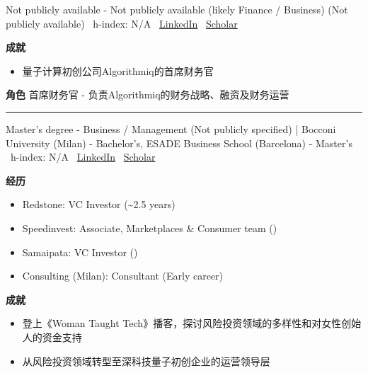 \par{\footnotesize\color{graytext}Not publicly available - Not publicly available (likely Finance / Business) (Not publicly available) \textbar\  h-index: N/A \textbar\  \href{https://www.linkedin.com/in/benjaminbakkernz/}{LinkedIn} \textbar\  \href{N/A}{Scholar}}
\par{\footnotesize\color{mainred}\textbf{成就}}
\begin{itemize}[leftmargin=1.2em,itemsep=0pt,topsep=0pt]
\item {\footnotesize 量子计算初创公司Algorithmiq的首席财务官}
\end{itemize}
\par{\footnotesize\color{mainred}\textbf{角色}} {\footnotesize 首席财务官 - 负责Algorithmiq的财务战略、融资及财务运营}
\vspace{2pt}\hrule\vspace{2pt}
\vspace{4pt}
\par{\footnotesize\color{graytext}Master's degree - Business / Management (Not publicly specified) | Bocconi University (Milan) - Bachelor's, ESADE Business School (Barcelona) - Master's \textbar\  h-index: N/A \textbar\  \href{https://www.linkedin.com/in/irenegentili/}{LinkedIn} \textbar\  \href{N/A}{Scholar}}
\par{\footnotesize\color{mainred}\textbf{经历}}
\begin{itemize}[leftmargin=1.2em,itemsep=0pt,topsep=0pt]
\item {\footnotesize Redstone: VC Investor (\textasciitilde{}2.5 years)}
\item {\footnotesize Speedinvest: Associate, Marketplaces \& Consumer team ()}
\item {\footnotesize Samaipata: VC Investor ()}
\item {\footnotesize Consulting (Milan): Consultant (Early career)}
\end{itemize}
\par{\footnotesize\color{mainred}\textbf{成就}}
\begin{itemize}[leftmargin=1.2em,itemsep=0pt,topsep=0pt]
\item {\footnotesize 登上《Woman Taught Tech》播客，探讨风险投资领域的多样性和对女性创始人的资金支持}
\item {\footnotesize 从风险投资领域转型至深科技量子初创企业的运营领导层}
\end{itemize}
